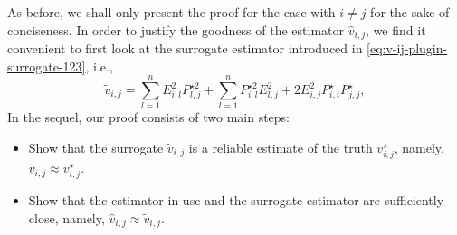 As before, we shall only present the proof for the case with $i\neq j$ for the sake of conciseness. 
In order to justify the goodness of the estimator $\widehat{v}_{i,j}$, 
we find it convenient to first look at the surrogate estimator introduced in \eqref{eq:v-ij-plugin-surrogate-123}, i.e., 
%
\begin{equation}
	\widetilde{v}_{i,j}=\sum_{l=1}^{n}E_{i,l}^{2}P_{l,j}^{\star 2}+\sum_{l=1}^{n}P_{i,l}^{\star 2}E_{l,j}^{2}+2E_{i,j}^{2}P_{i,i}^{\star}P_{j,j}^{\star}, 
	\label{eq:v-surrogate}
\end{equation}
%
In the sequel, our proof consists of two main steps: 
%
\begin{itemize}
	\item Show that the surrogate $\widetilde{v}_{i,j}$ is a reliable estimate of the truth ${v}^{\star}_{i,j}$, namely, $\widetilde{v}_{i,j}\approx {v}^{\star}_{i,j}$. 
	\item Show that the estimator in use and the surrogate estimator are sufficiently close, namely, $\widehat{v}_{i,j}\approx \widetilde{v}_{i,j}$.
\end{itemize}


